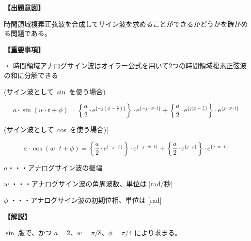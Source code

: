 \noindent \textbf{【出題意図】}

\bigskip
\noindent 時間領域複素正弦波を合成してサイン波を求めることができるかどうかを確かめる問題である。

\vspace{1em}
\noindent \textbf{【重要事項】}

\medskip
\noindent ・ 時間領域アナログサイン波はオイラー公式を用いて2つの時間領域複素正弦波の和に分解できる

\medskip
\noindent \mbox{(サイン波として sin を使う場合)}

\[
a \cdot \sin ( w \cdot t + \phi )
=  \left \{ \frac{a}{2} \cdot \textrm{e}^{\{-j (\phi-\frac{\pi}{2}) \}} \right \} \cdot \textrm{e}^{\{-j \cdot w \cdot t \}}
+  \left \{ \frac{a}{2} \cdot \textrm{e}^{\{j (\phi-\frac{\pi}{2} \}} \right \} \cdot \textrm{e}^{\{j \cdot w \cdot t \}}
\]

\medskip
\noindent \mbox{(サイン波として cos を使う場合))}

\[
a \cdot \cos ( w \cdot t + \phi )
=  \left \{ \frac{a}{2} \cdot \textrm{e}^{\{-j \cdot \phi \}} \right \} \cdot \textrm{e}^{\{-j \cdot w \cdot t \}}
+  \left \{ \frac{a}{2} \cdot \textrm{e}^{\{j  \cdot \phi \}} \right \} \cdot \textrm{e}^{\{j \cdot w \cdot t \}}
\]

\bigskip
\noindent  $a$・・・アナログサイン波の振幅

\bigskip
\noindent $w$ ・・・アナログサイン波の角周波数、単位は [rad/秒]

\bigskip
\noindent $\phi$ ・・・アナログサイン波の初期位相、単位は [rad]

\bigskip

\vspace{1em}
\noindent \textbf{【解説】}

\bigskip
\noindent $\sin$ 版で、かつ $a = 2$、$w = \pi/8$、$\phi = \pi/4$ により求まる。
